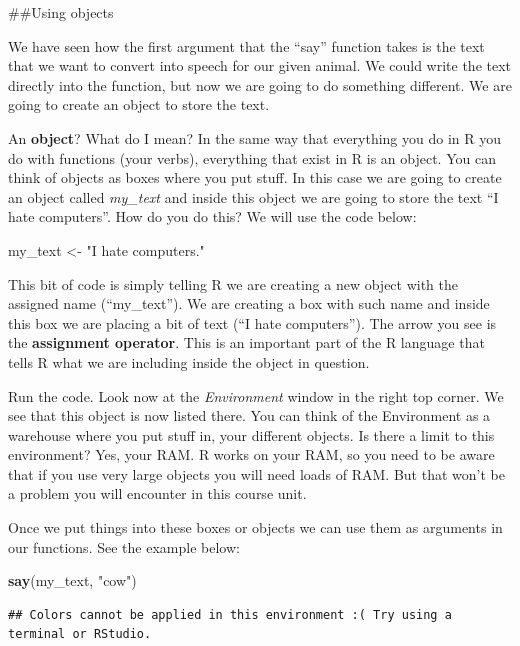 \documentclass[]{book}
\newenvironment{Shaded}{\begin{snugshade}}{\end{snugshade}}
\newcommand{\KeywordTok}[1]{\textcolor[rgb]{0.13,0.29,0.53}{\textbf{#1}}}
\newcommand{\NormalTok}[1]{#1}
\newcommand{\StringTok}[1]{\textcolor[rgb]{0.31,0.60,0.02}{#1}}
\theoremstyle{definition}
\theoremstyle{definition}
\theoremstyle{definition}
\theoremstyle{remark}
\begin{document}
\#\#Using objects

We have seen how the first argument that the ``say'' function takes is
the text that we want to convert into speech for our given animal. We
could write the text directly into the function, but now we are going to
do something different. We are going to create an object to store the
text.

An \textbf{object}? What do I mean? In the same way that everything you
do in R you do with functions (your verbs), everything that exist in R
is an object. You can think of objects as boxes where you put stuff. In
this case we are going to create an object called \emph{my\_text} and
inside this object we are going to store the text ``I hate computers''.
How do you do this? We will use the code below:

\begin{Shaded}
\begin{Highlighting}[]
\NormalTok{my_text <-}\StringTok{ "I hate computers."}
\end{Highlighting}
\end{Shaded}

This bit of code is simply telling R we are creating a new object with
the assigned name (``my\_text''). We are creating a box with such name
and inside this box we are placing a bit of text (``I hate computers'').
The arrow you see is the \textbf{assignment operator}. This is an
important part of the R language that tells R what we are including
inside the object in question.

Run the code. Look now at the \emph{Environment} window in the right top
corner. We see that this object is now listed there. You can think of
the Environment as a warehouse where you put stuff in, your different
objects. Is there a limit to this environment? Yes, your RAM. R works on
your RAM, so you need to be aware that if you use very large objects you
will need loads of RAM. But that won't be a problem you will encounter
in this course unit.

Once we put things into these boxes or objects we can use them as
arguments in our functions. See the example below:

\begin{Shaded}
\begin{Highlighting}[]
\KeywordTok{say}\NormalTok{(my_text, }\StringTok{"cow"}\NormalTok{)}
\end{Highlighting}
\end{Shaded}

\begin{verbatim}
## Colors cannot be applied in this environment :( Try using a terminal or RStudio.
\end{verbatim}
\end{document}
